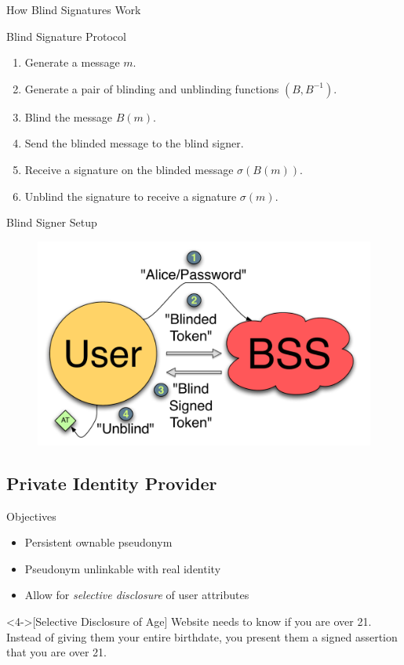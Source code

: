 \documentclass[handout]{beamer}
\begin{document}
\begin{frame}{How Blind Signatures Work}

\begin{alertblock}{Blind Signature Protocol}
  \begin{enumerate}
    \item<1-> Generate a message $m$.
    \item<2-> Generate a pair of blinding and unblinding functions $(B,B^{-1})$.
    \item<3-> Blind the message $B(m)$.
    \item<4-> Send the blinded message to the blind signer.
    \item<5-> Receive a signature on the blinded message $\sigma(B(m))$.
    \item<6-> Unblind the signature to receive a signature $\sigma(m)$.
  \end{enumerate}
\end{alertblock}

\end{frame}

\begin{frame}{Blind Signer Setup}
  \begin{figure}
    \centering
    \includegraphics[scale=0.5]{figs/fig-bss-setup-color.pdf}
  \end{figure}
\end{frame}

\subsection{Private Identity Provider}

\begin{frame}{Objectives}
  \begin{itemize}
    \item<1-> Persistent ownable pseudonym
    \item<2-> Pseudonym unlinkable with real identity
    \item<3-> Allow for \emph{selective disclosure} of user attributes
  \end{itemize}

  \begin{example}<4->[Selective Disclosure of Age]
    Website needs to know if you are over 21. Instead of giving them your entire
    birthdate, you present them a signed assertion that you are over 21.
  \end{example}
\end{frame}
\end{document}
